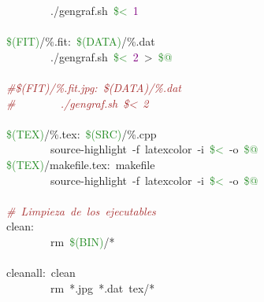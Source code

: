 \mbox{}\ \ \ \ \ \ \ \ \textcolor{BrickRed}{.}/gengraf.sh\ \textcolor{ForestGreen}{\$\textless{}}\ \textcolor{Purple}{1} \\
\mbox{} \\
\mbox{}\textcolor{ForestGreen}{\$(FIT)}\textcolor{BrickRed}{/\%}.fit\textcolor{BrickRed}{:}\ \textcolor{ForestGreen}{\$(DATA)}\textcolor{BrickRed}{/\%}.dat \\
\mbox{}\ \ \ \ \ \ \ \ \textcolor{BrickRed}{.}/gengraf.sh\ \textcolor{ForestGreen}{\$\textless{}}\ \textcolor{Purple}{2}\ \textcolor{BrickRed}{\textgreater{}}\ \textcolor{ForestGreen}{\$@} \\
\mbox{} \\
\mbox{}\textit{\textcolor{Brown}{\#\$(FIT)/\%.fit.jpg:\ \$(DATA)/\%.dat}} \\
\mbox{}\textit{\textcolor{Brown}{\#\ \ \ \ \ \ \ \ ./gengraf.sh\ \$\textless{}\ 2}} \\
\mbox{} \\
\mbox{}\textcolor{ForestGreen}{\$(TEX)}\textcolor{BrickRed}{/\%}.tex\textcolor{BrickRed}{:}\ \textcolor{ForestGreen}{\$(SRC)}\textcolor{BrickRed}{/\%}.cpp \\
\mbox{}\ \ \ \ \ \ \ \ source-highlight\ -f\ latexcolor\ -i\ \textcolor{ForestGreen}{\$\textless{}}\ -o\ \textcolor{ForestGreen}{\$@} \\
\mbox{}\textcolor{ForestGreen}{\$(TEX)}/makefile.tex\textcolor{BrickRed}{:}\ makefile \\
\mbox{}\ \ \ \ \ \ \ \ source-highlight\ -f\ latexcolor\ -i\ \textcolor{ForestGreen}{\$\textless{}}\ -o\ \textcolor{ForestGreen}{\$@} \\
\mbox{} \\
\mbox{}\textit{\textcolor{Brown}{\#\ Limpieza\ de\ los\ ejecutables}} \\
\mbox{}\textcolor{BrickRed}{clean:} \\
\mbox{}\ \ \ \ \ \ \ \ rm\ \textcolor{ForestGreen}{\$(BIN)}\textcolor{BrickRed}{/*} \\
\mbox{} \\
\mbox{}\textcolor{BrickRed}{cleanall:}\ clean \\
\mbox{}\ \ \ \ \ \ \ \ rm\ \textcolor{BrickRed}{*}.jpg\ \textcolor{BrickRed}{*}.dat\ tex\textcolor{BrickRed}{/*} \\
\mbox{}
